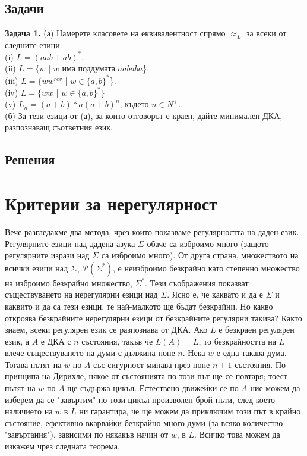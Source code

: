 \documentclass[openany]{book}
\begin{document}
        \subsection{Задачи}
            \textbf{Задача 1.} (а) Намерете класовете на еквивалентност спрямо $\approx_L$ за 
            всеки от следните езици: \\
            (i) $L = (aab + ab)^*$.\\
            (ii) $L = \{w$ | $w$ има поддумата $aababa$\}.\\
            (iii) $L = \{ww^{rev}$ | $w \in \{a,b\}^*$\}.\\
            (iv) $L = \{ww$ | $w \in \{a,b\}^*\}$\\
            (v) $L_n = (a+b)*a(a+b)^n$, където $n \in N^+$. \\
            
            (б) За тези езици от (а), за които отговорът е краен, дайте минимален ДКА, разпознаващ
            съответния език.
        
        
        
        \vspace{25pt}
        
        \subsection{Решения}        

\section{Критерии за нерегулярност}
    \hspace{15pt} Вече разгледахме два метода, чрез които показваме регулярността на 
    даден език. Регулярните езици над дадена азука $\Sigma$ обаче са изброимо много (защото 
    регулярните изрази над $\Sigma$ са изброимо много). От друга страна, 
    множеството на всички езици над $\Sigma$, $\mathscr{P}(\Sigma^*)$, е неизброимо
    безкрайно като степенно множество на изброимо безкрайно множество, $\Sigma^*$.
    Тези съображения показват съществуването на нерегулярни езици над $\Sigma$.
    Ясно е, че каквато и да е $\Sigma$ и каквито и да са тези езици, те най-малкото 
    ще бъдат безкрайни. Но какво откроява безкрайните нерегулярни езици от безкрайните
    регулярни такива? Както знаем, всеки регулярен език се разпознава от ДКА. Ако $L$
    е безкраен регулярен език, а $A$ е ДКА с $n$ състояния, такъв че $L(A) = L$, 
    то безкрайността на $L$ влече съществуването на думи с дължина поне $n$. Нека
    $w$ е една такава дума. Тогава пътят на $w$ по $A$ със сигурност минава през поне
    $n+1$ състояния. По принципа на Дирихле, някое от състоянията по този път ще се 
    повтаря; тоест пътят на $w$ по $A$ ще съдържа цикъл. Естествено движейки се по $A$
    ние можем да изберем да се "завъртим"\hspace{0.01cm} по този цикъл произволен брой пъти, след което
    наличието на $w$ в $L$ ни гарантира, че ще можем да приключим този път в крайно
    състояние, ефективно вкарвайки безкрайно много думи (за всяко количество "завъртания"),
    зависими по някакъв начин от $w$, в $L$. Всичко това можем да изкажем чрез следната
    теорема.
\end{document}
